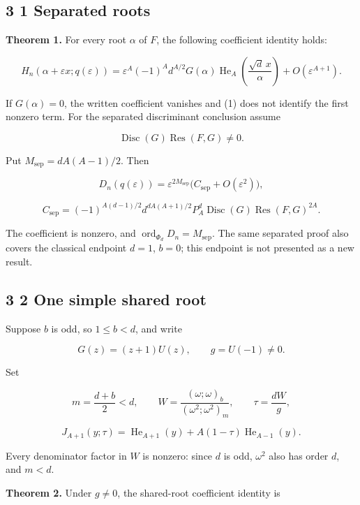 \documentclass[
  11pt,
]{article}
\begin{document}
\subsection{3 1 Separated roots}\label{separated-roots}

\textbf{Theorem 1.} For every root \(\alpha\) of \(F\), the following
coefficient identity holds:

\[
H_n(\alpha+\varepsilon x;q(\varepsilon))
=\varepsilon^A(-1)^A d^{A/2}G(\alpha)
\operatorname{He}_A\!\left(\frac{\sqrt d\,x}{\alpha}\right)
+O(\varepsilon^{A+1}). \tag{1}
\]

If \(G(\alpha)=0\), the written coefficient vanishes and (1) does not
identify the first nonzero term. For the separated discriminant
conclusion assume

\[
\operatorname{Disc}(G)\operatorname{Res}(F,G)\ne 0. \tag{2}
\]

Put \(M_{\mathrm{sep}}=dA(A-1)/2\). Then

\[
D_n(q(\varepsilon))=
\varepsilon^{2M_{\mathrm{sep}}}
\bigl(C_{\mathrm{sep}}+O(\varepsilon^2)\bigr), \tag{3}
\]

\[
C_{\mathrm{sep}}=
(-1)^{A(d-1)/2}d^{dA(A+1)/2}P_A^d
\operatorname{Disc}(G)\operatorname{Res}(F,G)^{2A}. \tag{4}
\]

The coefficient is nonzero, and
\(\operatorname{ord}_{\Phi_d}D_n=M_{\mathrm{sep}}\). The same separated
proof also covers the classical endpoint \(d=1\), \(b=0\); this endpoint
is not presented as a new result.

\subsection{3 2 One simple shared root}\label{one-simple-shared-root}

Suppose \(b\) is odd, so \(1\leq b<d\), and write

\[
G(z)=(z+1)U(z),\qquad g=U(-1)\ne 0.
\]

Set

\[
m=\frac{d+b}{2}<d,\qquad
W=\frac{(\omega;\omega)_b}{(\omega^2;\omega^2)_m},
\qquad \tau=\frac{dW}{g}, \tag{5}
\]

\[
J_{A+1}(y;\tau)=\operatorname{He}_{A+1}(y)
+A(1-\tau)\operatorname{He}_{A-1}(y). \tag{6}
\]

Every denominator factor in \(W\) is nonzero: since \(d\) is odd,
\(\omega^2\) also has order \(d\), and \(m<d\).

\textbf{Theorem 2.} Under \(g\ne 0\), the shared-root coefficient
identity is
\end{document}
